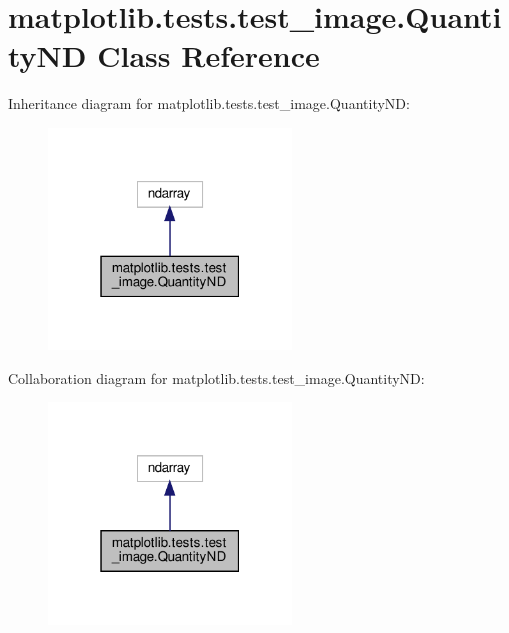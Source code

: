 \hypertarget{classmatplotlib_1_1tests_1_1test__image_1_1QuantityND}{}\section{matplotlib.\+tests.\+test\+\_\+image.\+Quantity\+ND Class Reference}
\label{classmatplotlib_1_1tests_1_1test__image_1_1QuantityND}


Inheritance diagram for matplotlib.\+tests.\+test\+\_\+image.\+Quantity\+ND\+:
\nopagebreak
\begin{figure}[H]
\begin{center}
\leavevmode
\includegraphics[width=183pt]{classmatplotlib_1_1tests_1_1test__image_1_1QuantityND__inherit__graph}
\end{center}
\end{figure}


Collaboration diagram for matplotlib.\+tests.\+test\+\_\+image.\+Quantity\+ND\+:
\nopagebreak
\begin{figure}[H]
\begin{center}
\leavevmode
\includegraphics[width=183pt]{classmatplotlib_1_1tests_1_1test__image_1_1QuantityND__coll__graph}
\end{center}
\end{figure}
